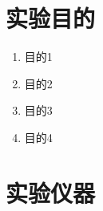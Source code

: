 \fancypage{\fbox}{}
\section{实验目的}
\begin{enumerate}
    \item 目的1
    \item 目的2
    \item 目的3
    \item 目的4
\end{enumerate}

\section{实验仪器}
~\\
~\\
~\\












